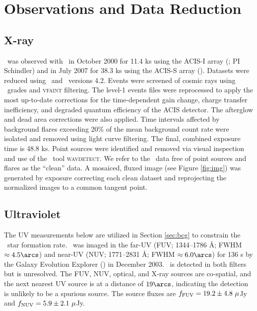 \documentclass[11pt, preprint]{aastex}
\begin{document}
\section{Observations and Data Reduction}
\label{sec:obs}

\subsection{X-ray}

\rbs\ was observed with \cxo\ in October 2000 for 11.4 ks using the
ACIS-I array (; PI
Schindler) and in July 2007 for 38.3 ks using the ACIS-S array
(). Datasets were reduced
using \ciao\ and \caldb\ versions 4.2. Events were screened of cosmic
rays using \asca\ grades and {\textsc{vfaint}} filtering. The level-1
events files were reprocessed to apply the most up-to-date corrections
for the time-dependent gain change, charge transfer inefficiency, and
degraded quantum efficiency of the ACIS detector. The afterglow and
dead area corrections were also applied. Time intervals affected by
background flares exceeding 20\% of the mean background count rate
were isolated and removed using light curve filtering. The final,
combined exposure time is 48.8 ks. Point sources were identified and
removed via visual inspection and use of the \ciao\ tool
{\textsc{wavdetect}}. We refer to the \cxo\ data free of point sources
and flares as the ``clean'' data. A mosaiced, fluxed image (see Figure
\ref{fig:img}) was generated by exposure correcting each clean dataset
and reprojecting the normalized images to a common tangent point.

\subsection{Ultraviolet}

The UV measurements below are utilized in Section \ref{sec:bcg} to
constrain the \rbs\ star formation rate. \rbs\ was imaged in the
far-UV (FUV; 1344--1786 \AA; FWHM $\approx 4.5\arcs$) and near-UV
(NUV; 1771--2831 \AA; FWHM $\approx 6.0\arcs$) for 136 s by the Galaxy
Evolution Explorer (\galex) in December 2003. \rbs\ is detected in
both filters but is unresolved. The FUV, NUV, optical, and X-ray
sources are co-spatial, and the next nearest UV source is at a
distance of $19\arcs$, indicating the detection is unlikely to be a
spurious source. The source fluxes are $f_{\rm{FUV}} = 19.2 \pm 4.8
~\mu$Jy and $f_{\rm{NUV}} = 5.9 \pm 2.1 ~\mu$Jy.
\end{document}
